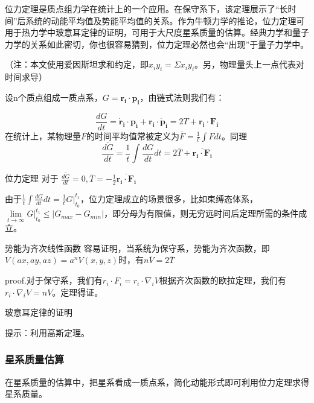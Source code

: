 

位力定理是质点组力学在统计上的一个应用。在保守系下，该定理展示了“长时间”后系统的动能平均值及势能平均值的关系。作为牛顿力学的推论，位力定理可用于热力学中玻意耳定律的证明，可用于大尺度星系质量的估算。经典力学和量子力学的关系如此密切，你也很容易猜到，位力定理必然也会“出现”于量子力学中。

（注：本文使用爱因斯坦求和约定，即$x_iy_i=\Sigma x_iy_i$。另，物理量头上一点代表对时间求导）

设n个质点组成一质点系，$G=\boldsymbol{r_i\cdot p_i}$，由链式法则我们有：

\begin{equation}
\frac{dG}{dt}=\boldsymbol{\dot{r}_i\cdot p_i}+\boldsymbol{r_i\cdot\dot{p}_i}=2T+\boldsymbol{r_i\cdot F_i}
\end{equation}
在统计上，某物理量$F$的时间平均值常被定义为$\overline{F}=\frac{1}{t}\int Fdt $。同理
\begin{equation}
\overline{\frac{dG}{dt}}=\frac{1}{t}\int \frac{dG}{dt}dt=2\overline{ T}+\overline{\boldsymbol{r_i\cdot F_i}}
\end{equation}

\begin{theorem}{位力定理}
对于 $\overline{\frac{dG}{dt}}=0,
\overline{ T}=-\frac{1}{2}\overline{\boldsymbol{r_i\cdot F_i}}$
\end{theorem}
由于$\frac{1}{t}\int \frac{dG}{dt}dt=\frac{1}{t}G\big|_{t_0}^{t_1}$，位力定理成立的场景很多，比如束缚态体系，$\lim \limits_{t \to \infty}G\big|_{t_0}^{t_1}\leq \left|{G_{max}-G_{min}}\right|$，即分母为有限值，则无穷远时间后定理所需的条件成立。
\begin{corollary}{势能为齐次线性函数}
容易证明，当系统为保守系，势能为齐次函数，即$V(ax,ay,az)=a^nV(x,y,z)$时，有$n\bar{V}=2\bar{T}$
\end{corollary}
proof.对于保守系，我们有$r_i\cdot F_i=r_i\cdot \nabla_i V$根据齐次函数的欧拉定理，我们有$r_i\cdot \nabla_i V=n V$。定理得证。
\begin{exercise}{玻意耳定律的证明}
\end{exercise}
提示：利用高斯定理。
\subsubsection{星系质量估算}  
在星系质量的估算中，把星系看成一质点系，简化动能形式即可利用位力定理求得星系质量。